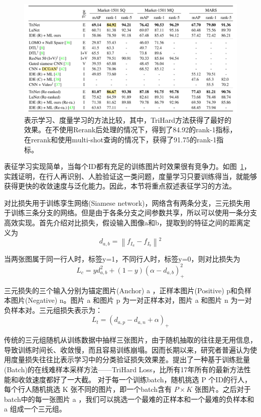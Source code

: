    \begin{figure}[!htbp]
        \centering
        \includegraphics[width=\linewidth,keepaspectratio]{data/kaitibaogao/loss-perf.png}
        \caption{表示学习、度量学习的方法比较，其中，TriHard方法获得了最好的效果。在不使用Rerank后处理的情况下，得到了84.92的rank-1指标，在rerank和使用multi-shot查询的情况下，获得了91.75的rank-1指标。}
        \label{figure:loss}
    \end{figure}

    表征学习实现简单，当每个ID都有充足的训练图片时效果很有竞争力。如图~\ref{figure:loss}，实践证明，在行人再识别、人脸验证这一类问题，度量学习只要训练得当，就能够获得更快的收敛速度与泛化能力。因此，本节将重点叙述表征学习的方法。

    对比损失用于训练孪生网络(Siamese network)，网络含有两条分支，三元损失用于训练三条分支的网络。但是由于各条分支之间参数共享，所以可以使用一条分支高效实现。首先介绍对比损失，假设输入图像a和b，提取到的特征之间的距离定义为
    \begin{equation} {d_{a,b}} = \left\|{f_{{I_a}}} - {f_{{I_b}}}\right\|{^2}\end{equation} 
    
    当两张图属于同一行人时，标签y=1，不同行人时，标签y=0，则对比损失为
    \begin{equation} {L_c} = yd_{a,b}^2 + (1 - y)(\alpha  - {d_{a,b}})_+^2\end{equation} 
    
    三元损失的三个输入分别为锚定图片(Anchor) a ，正样本图片(Positive) p和负样本图片(Negative) n。图片 a 和图片 p 为一对正样本对，图片 a 和图片 n 为一对负样本对。三元组损失表示为：
    \begin{equation} {L_t} = {({d_{a,p}} - {d_{a,n}} + \alpha )_ + }\end{equation} 
    
    传统的三元组随机从训练数据中抽样三张图片，由于随机抽取的往往是无用信息，导致训练时间长、收敛慢，而且容易训练崩塌。因而长期以来，研究者普遍认为使用度量损失往往比表示学习中的分类验证损失效果差。\cite{liu2017quality}提出了一种基于训练批量(Batch)的在线难样本采样方法——TriHard Loss，比所有17年所有的最新方法性能和收敛速度都好了一大截。
    对于每一个训练batch，随机挑选 P 个ID的行人，每个行人随机挑选 K 张不同的图片，即一个batch含有 $P\times K$ 张图片。之后对于batch中的每一张图片 a ，我们可以挑选一个最难的正样本和一个最难的负样本和 a 组成一个三元组。

